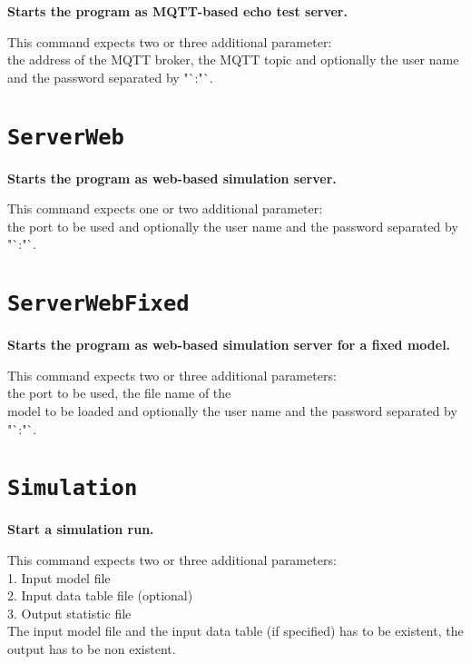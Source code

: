 \textbf{Starts the program as MQTT-based echo test server.}

This command expects two or three additional parameter:\\
the address of the MQTT broker, the MQTT topic and optionally the user name and the password separated by "`:"`.

\section{\texttt{ServerWeb}}

\textbf{Starts the program as web-based simulation server.}

This command expects one or two additional parameter:\\
the port to be used and optionally the user name and the password separated by "`:"`.

\section{\texttt{ServerWebFixed}}

\textbf{Starts the program as web-based simulation server for a fixed model.}

This command expects two or three additional parameters:\\
the port to be used, the file name of the\\
model to be loaded and optionally the user name and the password separated by "`:"`.

\section{\texttt{Simulation}}

\textbf{Start a simulation run.}

This command expects two or three additional parameters:\\
1. Input model file\\
2. Input data table file (optional)\\
3. Output statistic file\\
The input model file and the input data table (if specified) has to be existent, the output has to be non existent.

